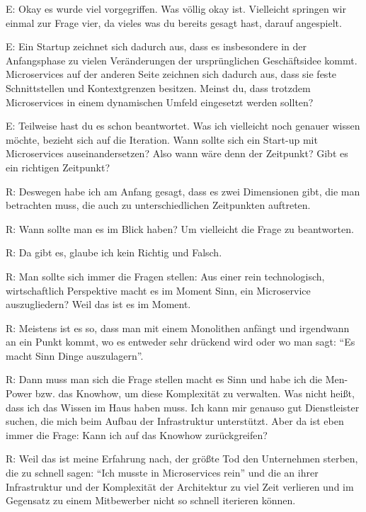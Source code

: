 E: Okay es wurde viel vorgegriffen. Was völlig okay ist. Vielleicht springen wir einmal zur Frage vier, da vieles was du bereits gesagt hast, darauf angespielt.

E: Ein Startup zeichnet sich dadurch aus, dass es insbesondere in der Anfangsphase zu vielen Veränderungen der ursprünglichen Geschäftsidee kommt. Microservices auf der anderen Seite zeichnen sich dadurch aus, dass sie feste Schnittstellen und Kontextgrenzen besitzen. Meinst du, dass trotzdem Microservices in einem dynamischen Umfeld eingesetzt werden sollten?

E: Teilweise hast du es schon beantwortet. Was ich vielleicht noch genauer wissen möchte, bezieht sich auf die Iteration. Wann sollte sich ein Start-up mit Microservices auseinandersetzen? Also wann wäre denn der Zeitpunkt? Gibt es ein richtigen Zeitpunkt? 

R: Deswegen habe ich am Anfang gesagt, dass es zwei Dimensionen gibt, die man betrachten muss, die auch zu unterschiedlichen Zeitpunkten auftreten.

R: Wann sollte man es im Blick haben? Um vielleicht die Frage zu beantworten.

\label{appendix:r-6}
R: Da gibt es, glaube ich kein Richtig und Falsch.

\label{appendix:r-7}
R: Man sollte sich immer die Fragen stellen: Aus einer rein technologisch, wirtschaftlich Perspektive macht es im Moment Sinn, ein Microservice auszugliedern? Weil das ist es im Moment.

\label{appendix:r-8} \label{appendix:r-9}
R: Meistens ist es so, dass man mit einem Monolithen anfängt und irgendwann an ein Punkt kommt, wo es entweder sehr drückend wird oder wo man sagt: “Es macht Sinn Dinge auszulagern”.

\label{appendix:r-10}
R: Dann muss man sich die Frage stellen macht es Sinn und habe ich die Men-Power bzw. das Knowhow, um diese Komplexität zu verwalten. Was nicht heißt, dass ich das Wissen im Haus haben muss. Ich kann mir genauso gut Dienstleister suchen, die mich beim Aufbau der Infrastruktur unterstützt. Aber da ist eben immer die Frage: Kann ich auf das Knowhow zurückgreifen?

\label{appendix:r-11}
R: Weil das ist meine Erfahrung nach, der größte Tod den Unternehmen sterben, die zu schnell sagen: “Ich musste in Microservices rein” und die an ihrer Infrastruktur und der Komplexität der Architektur zu viel Zeit verlieren und im Gegensatz zu einem Mitbewerber nicht so schnell iterieren können. 

